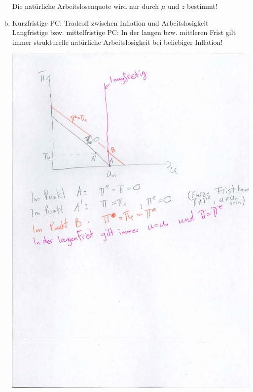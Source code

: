 \documentclass{scrartcl}
\begin{document}
\begin{enumerate}[a)]
  Die nat\"{u}rliche Arbeitslosenquote wird nur durch $\mu$ und $z$ bestimmt!
  \item Kurzfristige PC: Tradeoff zwischen Inflation und Arbeitslosigkeit\\
  Langfristige bzw. mittelfristige PC: In der langen bzw. mittleren Frist gilt immer strukturelle nat\"{u}rliche Arbeitslosigkeit bei beliebiger Inflation!
    \begin{center}
  \includegraphics[width=\textwidth]{Bilder/PhillipsKurve.pdf}
  \end{center}


\end{enumerate}
\end{document}
